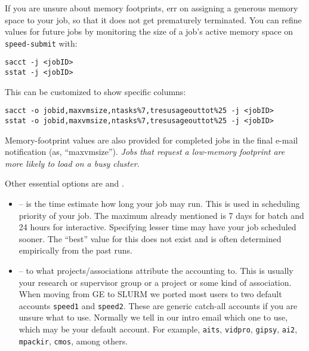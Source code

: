 If you are unsure about memory footprints, err on assigning a generous
memory space to your job, so that it does not get prematurely terminated.
You can refine
values for future jobs by monitoring the size of a job's active
memory space on \texttt{speed-submit} with:


\begin{verbatim}
sacct -j <jobID>
sstat -j <jobID>
\end{verbatim}

\noindent
This can be customized to show specific columns:

\begin{verbatim}
sacct -o jobid,maxvmsize,ntasks%7,tresusageouttot%25 -j <jobID>
sstat -o jobid,maxvmsize,ntasks%7,tresusageouttot%25 -j <jobID>
\end{verbatim}

Memory-footprint values are also provided for completed jobs in the final
e-mail notification (as, ``maxvmsize'').
%
\emph{Jobs that request a low-memory footprint are more likely to load on a busy
cluster.}

Other essential options are  and .
%
\begin{itemize}
\item
{} -- is the time estimate how long your job may run. This is
used in scheduling priority of your job. The maximum already mentioned
is 7 days for batch and 24 hours for interactive. Specifying lesser
time may have your job scheduled sooner. The ``best'' value for this
does not exist and is often determined empirically from the past runs.

\item
{} -- to what projects/associations attribute the accounting to. This is usually
your research or supervisor group or a project or some kind of
association. When moving from GE to SLURM we ported most users to
two default accounts \texttt{speed1} and \texttt{speed2}. These
are generic catch-all accounts if you are unsure what to use.
Normally we tell in our intro email which one to use, which may
be your default account. For example,
\texttt{aits},
\texttt{vidpro},
\texttt{gipsy},
\texttt{ai2},
\texttt{mpackir},
\texttt{cmos}, among others.

\end{itemize}
